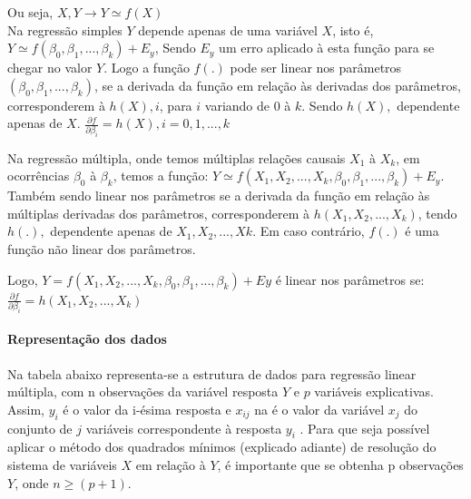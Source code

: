 \documentclass[	12pt, Times, openright, twoside, a4paper, english, brazil]{abntex2}
\begin{document}
          Ou seja, $X,Y \rightarrow Y \simeq f(X) $\\
          Na regressão simples $Y$ depende apenas de uma variável $X$, isto é, $Y \simeq f(\beta_0, \beta_1, ..., \beta_k) + E_y$, Sendo $E_y$ um erro aplicado à esta função para se chegar no valor $Y$. Logo a função $f(.)$ pode ser linear nos parâmetros $(\beta_0, \beta_1, ..., \beta_k)$, se a derivada da função em relação às derivadas dos parâmetros, corresponderem à $h(X),i$, para $i$ variando de $0$ à $k$. Sendo $h(X),$ dependente apenas de $X$.
          $\frac {\partial f}{\partial \beta_i} = h (X),i = 0,1,...,k $

          Na regressão múltipla, onde temos múltiplas relações causais $X_1$ à $X_k$, em ocorrências $\beta_0$ à $\beta_k$, temos a função: $Y \simeq f(X_1, X_2, ..., X_k, \beta_0, \beta_1, ..., \beta_k) + E_y$. Também sendo linear nos parâmetros se a derivada da função em relação às múltiplas derivadas dos parâmetros, corresponderem à $h(X_1,X_2,...,X_k)$, tendo $h(.),$ dependente apenas de $X_1,X_2,...,X k$. Em caso contrário, $f(.)$ é uma função não linear dos parâmetros.

          Logo, $Y=f(X_1,X_2,...,X_k,\beta_0,\beta_1,...,\beta_k)+E y$ é linear nos parâmetros se:
          $\frac {\partial f}{\partial \beta_i} = h(X_1,X_2,...,X_k)$
          
          \paragraph{Representação dos dados}
          Na tabela abaixo representa-se a estrutura de dados para regressão linear múltipla, com n observações da variável resposta $Y$ e $p$ variáveis explicativas. Assim, $y_i$ é o valor da i-ésima resposta e $x_{ij}$ na é o valor da variável $x_j$ do conjunto de $j$ variáveis correspondente à resposta $y_i$ .
          Para que seja possível aplicar o método dos quadrados mínimos (explicado adiante) de resolução do sistema de variáveis $X$ em relação à $Y$, é importante que se obtenha p observações $Y$, onde $n\geq (p+1)$.
          
\end{document}
